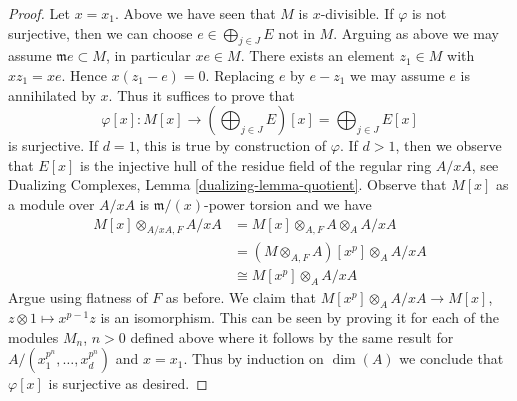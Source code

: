 \begin{proof}
\medskip\noindent
Let $x = x_1$. Above we have seen that $M$ is $x$-divisible.
If $\varphi$ is not surjective, then we can choose
$e \in \bigoplus_{j \in J} E$ not in $M$.
Arguing as above we may assume $\mathfrak m e \subset M$,
in particular $x e \in M$. There exists an element
$z_1 \in M$ with $x z_1 = x e$. Hence
$x(z_1 - e) = 0$. Replacing $e$ by $e - z_1$
we may assume $e$ is annihilated by $x$.
Thus it suffices to prove that
$$
\varphi[x] :
M[x]
\longrightarrow
\left(\bigoplus\nolimits_{j \in J} E\right)[x] =
\bigoplus\nolimits_{j \in J} E[x]
$$
is surjective. If $d = 1$, this is true by construction of $\varphi$.
If $d > 1$, then we observe that $E[x]$ is the injective hull
of the residue field of the regular ring $A/xA$, see
Dualizing Complexes, Lemma \ref{dualizing-lemma-quotient}.
Observe that $M[x]$ as a module over $A/xA$
is $\mathfrak m/(x)$-power torsion and we have
\begin{align*}
M[x] \otimes_{A/xA, F} A/xA
& = M[x] \otimes_{A, F} A \otimes_A A/xA \\
& = (M \otimes_{A, F} A)[x^p] \otimes_A A/xA \\
& \cong M[x^p] \otimes_A A/xA
\end{align*}
Argue using flatness of $F$ as before.
We claim that $M[x^p] \otimes_A A/xA \to M[x]$,
$z \otimes 1 \mapsto x^{p - 1}z$ is an isomorphism.
This can be seen by proving it for
each of the modules $M_n$, $n > 0$ defined above
where it follows by the same result for
$A/(x_1^{p^n}, \ldots, x_d^{p^n})$ and $x = x_1$.
Thus by induction on $\dim(A)$ we conclude that $\varphi[x]$
is surjective as desired.
\end{proof}
